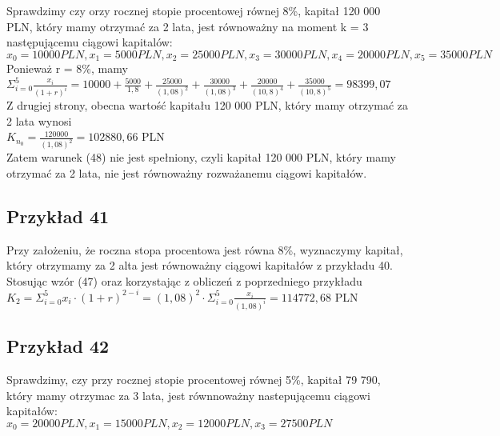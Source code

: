 \documentclass{article}
\begin{document}
Sprawdzimy czy orzy rocznej stopie procentowej równej 8\%, kapitał 120 000 PLN, który mamy otrzymać za 2 lata, jest równoważny na moment k = 3 następującemu ciągowi kapitalów:\\

$ x_0 = 10 000 PLN, x_1 = 5000 PLN, x_2 = 25000 PLN, x_3 = 30 000 PLN, x_4 = 20 000 PLN, x_5 = 35 000 PLN $\\

Ponieważ r = 8\%, mamy\\

$ \Sigma ^5_{i=0}\frac{x_i}{(1+r)^i} = 10 000 + \frac{5000}{1,8} + \frac{25000}{(1,08)^2} + \frac{30000}{(1,08)^3} + \frac{20000}{(10,8)^4} + \frac{35000}{(10,8)^5} = 98 399,07 $\\

Z drugiej strony, obecna wartość kapitału 120 000 PLN, który mamy otrzymać za 2 lata wynosi\\

$ K_n_0 = \frac{120 000}{(1,08)^2} = 102880,66 $ PLN\\

Zatem warunek (48) nie jest spełniony, czyli kapitał 120 000 PLN, który mamy otrzymać za 2 lata, nie jest równoważny rozważanemu ciągowi kapitałów.

\subsection{Przykład 41}

Przy założeniu, że roczna stopa procentowa jest równa 8\%, wyznaczymy kapitał, który otrzymamy za 2 alta jest równoważny ciągowi kapitałów z przykładu 40.\\

Stosując wzór (47) oraz korzystając z obliczeń z poprzedniego przykładu\\

$ K_2 = \Sigma ^5_{i=0} x_i \cdot (1+r)^{2-i} = (1,08)^2 \cdot \Sigma ^5_{i=0}\frac{x_i}{(1,08)^i} = 114772,68 $ PLN

\subsection{Przykład 42}

Sprawdzimy, czy przy rocznej stopie procentowej równej 5\%, kapitał 79 790, który mamy otrzymac za 3 lata, jest równnoważny nastepującemu ciągowi kapitałów:\\

$ x_0 = 20 000 PLN, x_1 = 15 000 PLN, x_2 = 12 000 PLN, x_3 = 27 500 PLN $\\
\end{document}
